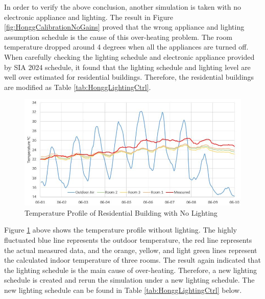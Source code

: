 \documentclass[a4paper, oneside]{discothesis}
\begin{document}
			In order to verify the above conclusion, another simulation is taken with no electronic appliance and lighting. The result in Figure \ref{fig:HonggCalibrationNoGains} proved that the wrong appliance and lighting assumption schedule is the cause of this over-heating problem. The room temperature dropped around 4 degrees when all the appliances are turned off. When carefully checking the lighting schedule and electronic appliance provided by SIA 2024 schedule, it found that the lighting schedule and lighting level are well over estimated for residential buildings. Therefore, the residential buildings are modified as Table \ref{tab:HonggLightingCtrl}. \\

			\begin{figure}[H]
			\centering
			\includegraphics[scale=0.75]{Hongg_Clibration_03NoLight.JPG}
			\caption{Temperature Profile of Residential Building with No Lighting}
			\label{fig:HonggerCalibrationNoLight}
			\end{figure}

			Figure \ref{fig:HonggerCalibrationNoLight} above shows the temperature profile without lighting. The highly fluctuated blue line represents the outdoor temperature, the red line represents the actual measured data, and the orange, yellow, and light green lines represent  the calculated indoor temperature of three rooms. The result again indicated that the lighting schedule is the main cause of over-heating. Therefore, a new lighting schedule is created and rerun the simulation under a new lighting schedule. The new lighting schedule can be found in Table \ref{tab:HonggLightingCtrl} below.
			
\end{document}
